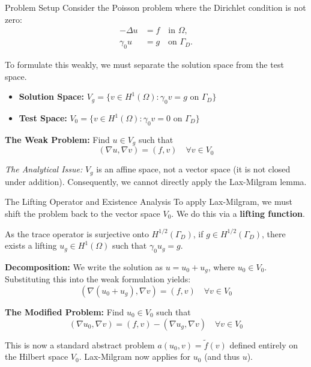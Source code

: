 \documentclass[aspectratio=169]{beamer}
\begin{document}
\begin{frame}{Problem Setup}
    Consider the Poisson problem where the Dirichlet condition is not zero:
    \begin{align*}
        -\Delta u &= f \quad \text{in } \Omega, \\
        \gamma_0 u &= g \quad \text{on } \Gamma_D.
    \end{align*}

    To formulate this weakly, we must separate the solution space from the test space.
    \begin{itemize}
        \item \textbf{Solution Space:} $V_g = \{ v \in H^1(\Omega) : \gamma_0 v = g \text{ on } \Gamma_D \}$
        \item \textbf{Test Space:} $V_0 = \{ v \in H^1(\Omega) : \gamma_0 v = 0 \text{ on } \Gamma_D \}$
    \end{itemize}

    \vspace{0.3cm}
    \textbf{The Weak Problem:} Find $u \in V_g$ such that
    $$ (\nabla u, \nabla v) = (f, v) \quad \forall v \in V_0 $$

    \vspace{0.2cm}
    \textit{The Analytical Issue:} $V_g$ is an affine space, not a vector space (it is not closed under addition). Consequently, we cannot directly apply the Lax-Milgram lemma.
\end{frame}

\begin{frame}{The Lifting Operator and Existence Analysis}
    To apply Lax-Milgram, we must shift the problem back to the vector space $V_0$. We do this via a \textbf{lifting function}.

    \vspace{0.2cm}
    As the trace operator is surjective onto $H^{1/2}(\Gamma_D)$, if $g \in H^{1/2}(\Gamma_D)$, there exists a lifting $u_g \in H^1(\Omega)$ such that $\gamma_0 u_g = g$.

    \vspace{0.2cm}
    \textbf{Decomposition:} We write the solution as $u = u_0 + u_g$, where $u_0 \in V_0$. Substituting this into the weak formulation yields:
    $$ (\nabla(u_0 + u_g), \nabla v) = (f, v) \quad \forall v \in V_0 $$

    \vspace{0.2cm}
    \textbf{The Modified Problem:} Find $u_0 \in V_0$ such that
    $$ (\nabla u_0, \nabla v) = (f, v) - (\nabla u_g, \nabla v) \quad \forall v \in V_0 $$

    \vspace{0.2cm}
    This is now a standard abstract problem $a(u_0, v) = \tilde{f}(v)$ defined entirely on the Hilbert space $V_0$. Lax-Milgram now applies for $u_0$ (and thus $u$).
\end{frame}
\end{document}
